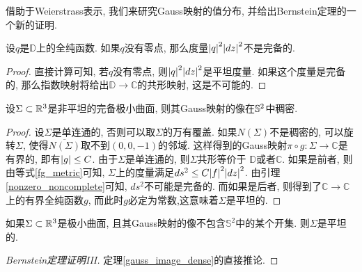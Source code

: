 借助于Weierstrass表示, 我们来研究Gauss映射的值分布, 并给出Bernstein定理的一个新的证明.
\begin{lemma} \label{nonzero_noncomplete}
    设$q$是$\mathbb{D}$上的全纯函数. 如果$q$没有零点, 那么度量$\abs{q}^2\abs{dz}^2$不是完备的.
\end{lemma}
\begin{proof}
    直接计算可知, 若$q$没有零点, 则$\abs{q}^2\abs{dz}^2$是平坦度量. 如果这个度量是完备的, 那么指数映射将给出$\mathbb{D}\to \mathbb{C}$的共形映射, 这是不可能的.
\end{proof}
\begin{theorem}\label{gauss_image_dense}
    设$\Sigma \subset\R^3$是非平坦的完备极小曲面, 则其Gauss映射的像在$\S^2$中稠密.
\end{theorem}
\begin{proof}
    设$\Sigma$是单连通的, 否则可以取$\Sigma$的万有覆盖. 如果$N(\Sigma)$不是稠密的, 可以旋转$\Sigma$, 使得$\overline{N(\Sigma)}$取不到$(0,0,-1)$的邻域.  这样得到的Gauss映射$\pi \circ g: \Sigma \to \mathbb{C}$是有界的, 即有$\abs{g} \le C$.  由于$\Sigma$是单连通的, 则$\Sigma$共形等价于 $\mathbb{D}$或者$\mathbb{C}$. 如果是前者, 则由等式\eqref{fg_metric}可知, $\Sigma$上的度量满足$ds^2 \le C\abs{f}^2\abs{dz}^2$. 由引理\eqref{nonzero_noncomplete}可知, $ds^2$不可能是完备的. 而如果是后者, 则得到了$\mathbb{C} \to \mathbb{C}$上的有界全纯函数$g$, 而此时$g$必定为常数,这意味着$\Sigma$是平坦的.
\end{proof}
\begin{corollary}
    如果$\Sigma \subset \R^3$是极小曲面, 且其Gauss映射的像不包含$\mathbb{S}^2$中的某个开集. 则$\Sigma$是平坦的.
\end{corollary}
\begin{proof}[Bernstein定理证明III]
    定理\eqref{gauss_image_dense}的直接推论.
\end{proof}
